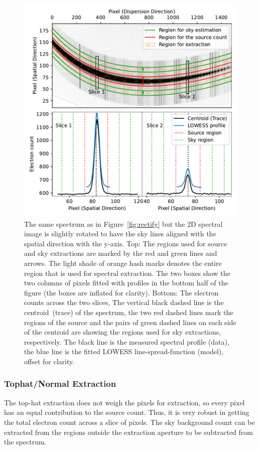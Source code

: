 \documentclass[fleqn,usenatbib]{mnras}
\begin{document}
\begin{figure}
    \centering
    \includegraphics[width=\columnwidth]{fig_03_extraction_profile.pdf}
    \caption{The same spectrum as in Figure~\ref{fig:rectify} but the
    2D spectral image is slightly rotated to have the sky lines
    aligned with the spatial direction with the y-axis.
    Top: The regions used for source and sky extractions are marked
    by the red and green lines and arrows. The light shade of orange
    hash marks denotes the entire region that is used for spectral extraction.
    The two boxes show the two columns of pixels fitted with
    profiles in the bottom half of the figure (the boxes are inflated
    for clarity). Bottom: The electron counts across the two slices,
    The vertical black dashed line is the centroid~(trace) of the spectrum,
    the two red dashed lines mark the regions of the source and the
    pairs of green dashed lines on each side of the centroid are
    showing the regions used for sky extractions, respectively. The
    black line is the measured spectral profile (data), the blue
    line is the fitted LOWESS line-spread-function (model), offset for
    clarity.}
    \label{fig:extraction}
\end{figure}

\subsubsection*{Tophat/Normal Extraction}
The top-hat extraction does not weigh the pixels for extraction,
so every pixel has an equal contribution to the source count. Thus,
it is very robust in getting the total electron count across
a slice of pixels. The sky background count can be extracted
from the regions outside the extraction aperture to be
subtracted from the spectrum.
\end{document}
